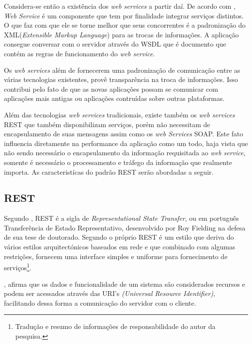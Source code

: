 	\par Considera-se então a existência dos \textit{web services} a partir daí. De
acordo com , \textit{Web Service} é um componente que
tem por finalidade integrar serviços distintos. O que faz com que ele se torne
melhor que seus concorrentes é a padronização do XML(\textit{Extensible Markup
Language}) para as trocas de informações. A aplicação consegue conversar com o
servidor através do WSDL que é documento que contém as regras de funcionamento
do \textit{web service}.
	
	\par Os \textit{web services} além de fornecerem uma padronização de
comunicação entre as várias tecnologias existentes, provê transparência na
troca de informações. Isso contribui pelo fato de que as novas aplicações
possam se comunicar com aplicações mais antigas ou aplicações contruídas sobre
outras plataformas.

	\par Além das tecnologias \textit{web services} tradicionais, existe também os
\textit{web services} REST que também disponibilizam serviços, porém não
necessitam de encapsulamento de suas mensagens assim como os \textit{web
Services} SOAP. Este fato influencia diretamente na performance da aplicação
como um todo, haja vista que não sendo necessário o encapsulamento da informação
requisitada ao \textit{web service}, somente é necessário o processamento e
tráfego da informação que realmente importa. As caracteristícas do padrão REST
serão abordadas a seguir.

	\subsection{REST}
	
	\par Segundo , REST é a sigla de
\textit{Representational State Transfer}, ou em português Transferência de
Estado Representativo, desenvolvido por Roy Fielding na defesa de sua tese de
doutorado. Segundo o próprio  REST é um estilo que
deriva do vários estilos arquitectónicos baseados em rede e  que combinado
com algumas restrições, fornecem uma interface simples e uniforme para
fornecimento de serviços\footnote{Tradução e resumo de informações de
responsabilidade do autor da pesquisa.}.
	
	\par {}, afirma que os dados e funcionalidade de um sistema
são considerados recursos e podem ser acessados através das URI's
\textit{(Universal Resource Identifier)}, facilitando dessa forma a comunicação
do servidor com o cliente.
	 	
